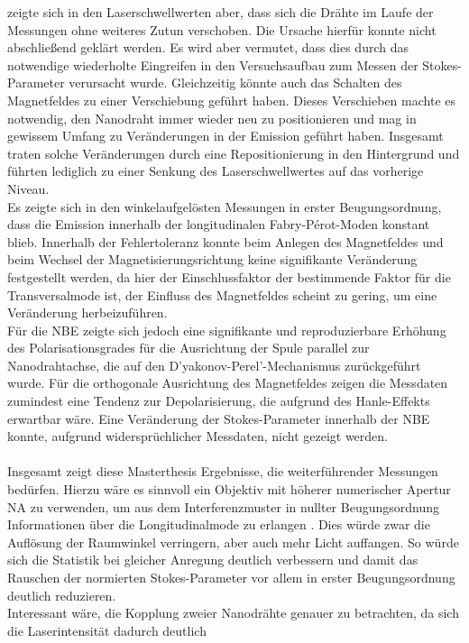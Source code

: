 zeigte sich in den Laserschwellwerten aber, dass sich die Drähte im Laufe der
Messungen ohne weiteres Zutun verschoben. Die Ursache hierfür konnte nicht
abschließend geklärt werden. Es wird aber vermutet, dass dies durch das
notwendige wiederholte Eingreifen in den Versuchsaufbau zum Messen der
Stokes-Parameter verursacht wurde. Gleichzeitig könnte auch das Schalten des
Magnetfeldes zu einer Verschiebung geführt haben. Dieses Verschieben machte es
notwendig, den Nanodraht immer wieder neu zu positionieren und mag in gewissem
Umfang zu Veränderungen in der Emission geführt haben. Insgesamt traten solche
Veränderungen durch eine Repositionierung in den Hintergrund und führten
lediglich zu einer Senkung des Laserschwellwertes auf das vorherige Niveau.\\ Es
zeigte sich in den winkelaufgelösten Messungen in erster Beugungsordnung, dass
die Emission innerhalb der longitudinalen Fabry-Pérot-Moden konstant blieb.
Innerhalb der Fehlertoleranz konnte beim Anlegen des Magnetfeldes und beim
Wechsel der Magnetisierungsrichtung keine signifikante Veränderung festgestellt
werden, da hier der Einschlussfaktor der bestimmende Faktor für die
Transversalmode ist, der Einfluss des Magnetfeldes scheint zu gering, um eine
Veränderung herbeizuführen.\\ Für die NBE zeigte sich jedoch eine signifikante
und reproduzierbare Erhöhung des Polarisationsgrades für die Ausrichtung der
Spule parallel zur Nanodrahtachse, die auf den D'yakonov-Perel'-Mechanismus
zurückgeführt wurde. Für die orthogonale Ausrichtung des Magnetfeldes zeigen die
Messdaten zumindest eine Tendenz zur Depolarisierung, die aufgrund des
Hanle-Effekts erwartbar wäre. Eine Veränderung der Stokes-Parameter innerhalb
der NBE konnte, aufgrund widersprüchlicher Messdaten, nicht gezeigt werden.\\\\
Insgesamt zeigt diese Masterthesis Ergebnisse, die weiterführender Messungen
bedürfen. Hierzu wäre es sinnvoll ein Objektiv mit höherer numerischer Apertur
NA zu verwenden, um aus dem Interferenzmuster in nullter Beugungsordnung
Informationen über die Longitudinalmode zu erlangen \cite{Saxena.2015}. Dies
würde zwar die Auflösung der Raumwinkel verringern, aber auch mehr Licht
auffangen. So würde sich die Statistik bei gleicher Anregung deutlich verbessern
und damit das Rauschen der normierten Stokes-Parameter vor allem in erster
Beugungsordnung deutlich reduzieren.\\ Interessant wäre, die Kopplung zweier
Nanodrähte genauer zu betrachten, da sich die Laserintensität dadurch deutlich
